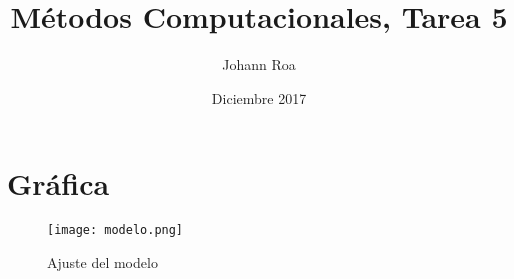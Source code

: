 \documentclass{article}
\title{Métodos Computacionales, Tarea 5}
\author{Johann Roa}
\date{Diciembre 2017}
\begin{document}
\maketitle

\section{Gráfica}
\begin{figure}
    \centering
    \texttt{[image: modelo.png]}
    \caption{Ajuste del modelo}
    \label{fig:my_label}
\end{figure}
\end{document}

